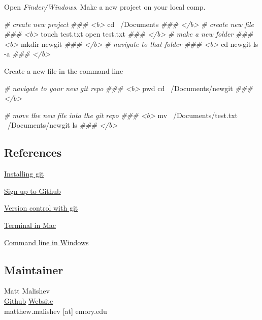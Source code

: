 \documentclass[10,portrait]{article}
\newenvironment{Shaded}{\begin{snugshade}}{\end{snugshade}}
\newcommand{\CommentTok}[1]{\textcolor[rgb]{0.56,0.35,0.01}{\textit{#1}}}
\newcommand{\FunctionTok}[1]{\textcolor[rgb]{0.00,0.00,0.00}{#1}}
\newcommand{\BuiltInTok}[1]{#1}
\newcommand{\ExtensionTok}[1]{#1}
\newcommand{\NormalTok}[1]{#1}
\begin{document}
Open \emph{Finder/Windows}. Make a new project on your local comp.

\begin{Shaded}
\begin{Highlighting}[]
\CommentTok{# create new project  }
\CommentTok{### <b> }
\BuiltInTok{cd}\NormalTok{ ~/Documents}
\CommentTok{### </b>}
\CommentTok{# create new file }
\CommentTok{### <b> }
\FunctionTok{touch}\NormalTok{ test.txt  }
\ExtensionTok{open}\NormalTok{ test.txt  }
\CommentTok{### </b> }
\CommentTok{# make a new folder  }
\CommentTok{### <b> }
\FunctionTok{mkdir}\NormalTok{ newgit  }
\CommentTok{### </b>}
\CommentTok{# navigate to that folder  }
\CommentTok{### <b>}
\BuiltInTok{cd}\NormalTok{ newgit}
\FunctionTok{ls}\NormalTok{ -a  }
\CommentTok{### </b>   }
\end{Highlighting}
\end{Shaded}

Create a new file in the command line

\begin{Shaded}
\begin{Highlighting}[]
\CommentTok{# navigate to your new git repo  }
\CommentTok{### <b>}
\BuiltInTok{pwd}  
\BuiltInTok{cd}\NormalTok{ ~/Documents/newgit}
\CommentTok{### </b> }

\CommentTok{# move the new file into the git repo      }
\CommentTok{### <b> }
\FunctionTok{mv}\NormalTok{ ~/Documents/test.txt ~/Documents/newgit}
\FunctionTok{ls}  
\CommentTok{### </b> }
\end{Highlighting}
\end{Shaded}

\subsection{References}\label{references}

\href{https://git-scm.com/book/en/v2/Getting-Started-Installing-Git}{Installing
git}

\href{https://github.com/}{Sign up to Github}

\href{https://git-scm.com/book/en/v2/Getting-Started-About-Version-Control}{Version
control with git}

\href{https://macpaw.com/how-to/use-terminal-on-mac}{Terminal in Mac}

\href{https://www.computerhope.com/issues/chusedos.htm}{Command line in
Windows}

\href{}{}

\subsection{Maintainer}\label{maintainer}

Matt Malishev\\
\href{https://github.com/darwinanddavis}{Github} \textbar{}
\href{https://www.researchgate.net/profile/Matt_Malishev}{Website}\\
matthew.malishev {[}at{]} emory.edu

\printbibliography
\end{document}
